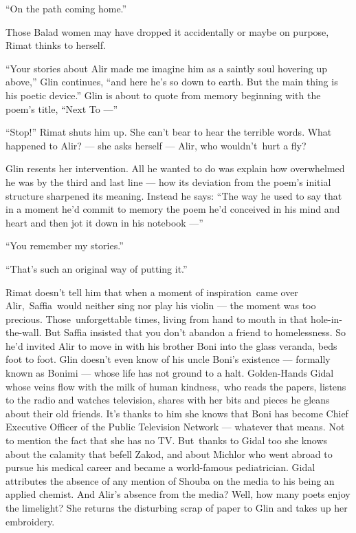 \documentclass[twoside,11pt,openany]{book}
\begin{document}
``On the path coming home.''

Those Balad women may have dropped it accidentally or maybe on purpose, Rimat thinks to
herself{. }

``Your stories about Alir made me imagine him as a
saintly soul hovering up above,'' Glin continues, ``and here he's so down to earth. But the
main thing is his poetic device.'' Glin is about to quote from memory beginning with the poem's title, ``Next To ---''


{{}``Stop!'' Rimat }shuts him
up{. She can't bear to hear the terrible words. What happened to
Alir? --- she asks herself --- Alir, who wouldn't~hurt a fly?}

{Glin }resents her intervention. All he wanted to do
was{ explain how overwhelmed he was by the third and last line --- how
its deviation from the poem's initial structure sharpened its meaning. Instead he says: {}``The way he used to say
that in a moment he'd commit to memory the poem }he'd conceived in his mind and heart
{and then jot it down in his notebook ---'' }

{}``You remember my stories.''

``That's such an original way of putting it.''

{Rimat doesn't tell him that when a moment of inspiration~came over
Alir,~Saffia~would neither sing nor play his violin --- the moment was too precious. Those~unforgettable times,
living from hand to mouth in that hole-in-the-wall. But Saffia insisted that you don't abandon a friend to
homelessness. So} he'd invited Alir to move in with his brother Boni into the glass veranda, beds foot to
foot. Glin doesn't even know of his uncle Boni's existence --- formally known as Bonimi --- whose life has not ground
to a halt. Golden-Hands Gidal whose veins flow with the milk of human kindness,~who reads the papers, listens to the
radio and watches television, shares with her bits and pieces he gleans about their old friends. It's thanks to him she
knows that Boni has become Chief Executive Officer of the Public Television Network --- whatever that means. Not to
mention the fact that she has no TV. But~thanks to Gidal too she knows about the calamity that befell Zakod, and about
Michlor who went abroad to pursue his medical career and became a world-famous pediatrician. Gidal attributes the
absence of any mention of Shouba on the media to his being an applied chemist. And Alir's absence from the media? Well,
how many poets enjoy the limelight? She returns the disturbing scr{ap
of paper to Glin and takes up her embroidery.}
\end{document}
